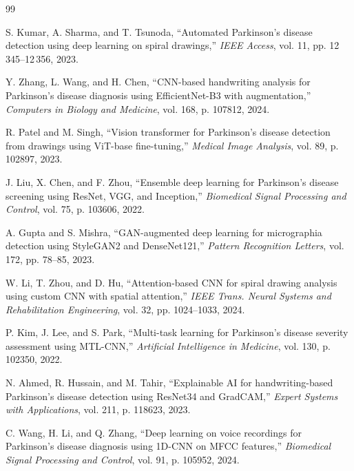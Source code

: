 \documentclass[10pt,conference,letterpaper]{IEEEtran}
\begin{document}
\begin{thebibliography}{99}


 S. Kumar, A. Sharma, and T. Tsunoda, ``Automated {P}arkinson's disease detection using deep learning on spiral drawings,'' \textit{IEEE Access}, vol. 11, pp. 12\,345--12\,356, 2023.

 Y. Zhang, L. Wang, and H. Chen, ``{CNN}-based handwriting analysis for {P}arkinson's disease diagnosis using {EfficientNet-B3} with augmentation,'' \textit{Computers in Biology and Medicine}, vol. 168, p. 107812, 2024.

 R. Patel and M. Singh, ``Vision transformer for {P}arkinson's disease detection from drawings using {ViT}-base fine-tuning,'' \textit{Medical Image Analysis}, vol. 89, p. 102897, 2023.

 J. Liu, X. Chen, and F. Zhou, ``Ensemble deep learning for {P}arkinson's disease screening using {ResNet}, {VGG}, and {Inception},'' \textit{Biomedical Signal Processing and Control}, vol. 75, p. 103606, 2022.

 A. Gupta and S. Mishra, ``{GAN}-augmented deep learning for micrographia detection using {StyleGAN2} and {DenseNet121},'' \textit{Pattern Recognition Letters}, vol. 172, pp. 78--85, 2023.

 W. Li, T. Zhou, and D. Hu, ``Attention-based {CNN} for spiral drawing analysis using custom {CNN} with spatial attention,'' \textit{IEEE Trans. Neural Systems and Rehabilitation Engineering}, vol. 32, pp. 1024--1033, 2024.

 P. Kim, J. Lee, and S. Park, ``Multi-task learning for {P}arkinson's disease severity assessment using {MTL-CNN},'' \textit{Artificial Intelligence in Medicine}, vol. 130, p. 102350, 2022.

 N. Ahmed, R. Hussain, and M. Tahir, ``Explainable {AI} for handwriting-based {P}arkinson's disease detection using {ResNet34} and {GradCAM},'' \textit{Expert Systems with Applications}, vol. 211, p. 118623, 2023.


 C. Wang, H. Li, and Q. Zhang, ``Deep learning on voice recordings for {P}arkinson's disease diagnosis using 1D-{CNN} on {MFCC} features,'' \textit{Biomedical Signal Processing and Control}, vol. 91, p. 105952, 2024.


\end{thebibliography}
\end{document}
